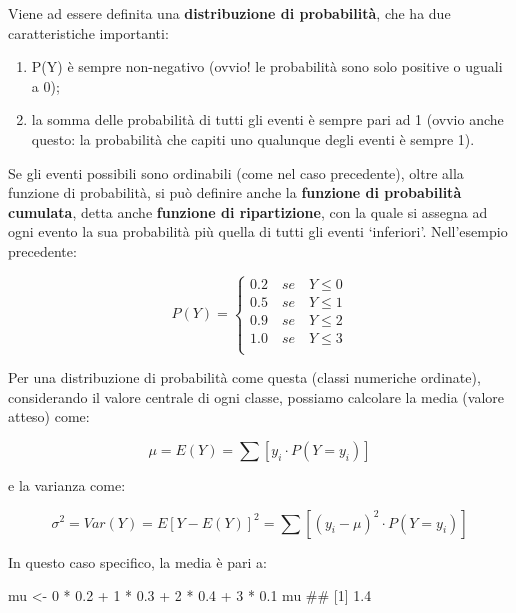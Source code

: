 \documentclass[a4paper,12pt,oneside]{book}
\providecommand{\tightlist}{%
  \setlength{\itemsep}{0pt}\setlength{\parskip}{0pt}}
\newenvironment{Shaded}{\begin{snugshade}}{\end{snugshade}}
\newcommand{\DecValTok}[1]{#1}
\newcommand{\FloatTok}[1]{#1}
\newcommand{\SpecialCharTok}[1]{#1}
\newcommand{\DocumentationTok}[1]{#1}
\newcommand{\OtherTok}[1]{#1}
\newcommand{\NormalTok}[1]{#1}
\begin{document}
Viene ad essere definita una \textbf{distribuzione di probabilità}, che ha due caratteristiche importanti:

\begin{enumerate}
\def\labelenumi{\arabic{enumi}.}
\tightlist
\item
  P(Y) è sempre non-negativo (ovvio! le probabilità sono solo positive o uguali a 0);
\item
  la somma delle probabilità di tutti gli eventi è sempre pari ad 1 (ovvio anche questo: la probabilità che capiti uno qualunque degli eventi è sempre 1).
\end{enumerate}

Se gli eventi possibili sono ordinabili (come nel caso precedente), oltre alla funzione di probabilità, si può definire anche la \textbf{funzione di probabilità cumulata}, detta anche \textbf{funzione di ripartizione}, con la quale si assegna ad ogni evento la sua probabilità più quella di tutti gli eventi `inferiori'. Nell'esempio precedente:

\[
P(Y) = \left\{ \begin{array}{l}
 0.2\,\,\,\,\,\,se\,\,\,\,\,\,Y \leq 0 \\ 
 0.5\,\,\,\,\,\,se\,\,\,\,\,\,Y \leq 1 \\ 
 0.9\,\,\,\,\,\,se\,\,\,\,\,\,Y \leq 2 \\ 
 1.0\,\,\,\,\,\,se\,\,\,\,\,\,Y \leq 3 \\ 
 \end{array} \right.
\]

Per una distribuzione di probabilità come questa (classi numeriche ordinate), considerando il valore centrale di ogni classe, possiamo calcolare la media (valore atteso) come:

\[
\mu  = E(Y) = \sum{\left[ y_i \cdot P(Y = y_i ) \right]}
\]

e la varianza come:

\[\sigma ^2  = Var(Y) = E\left[ {Y - E(Y)} \right]^2  = \sum{ \left[ {\left( {y_i  - \mu } \right)^2 \cdot P(Y = y_i )} \right]}\]

In questo caso specifico, la media è pari a:

\begin{Shaded}
\begin{Highlighting}[]
\NormalTok{mu }\OtherTok{\textless{}{-}} \DecValTok{0} \SpecialCharTok{*} \FloatTok{0.2} \SpecialCharTok{+} \DecValTok{1} \SpecialCharTok{*} \FloatTok{0.3} \SpecialCharTok{+} \DecValTok{2} \SpecialCharTok{*} \FloatTok{0.4} \SpecialCharTok{+} \DecValTok{3} \SpecialCharTok{*} \FloatTok{0.1}
\NormalTok{mu}
\DocumentationTok{\#\# [1] 1.4}
\end{Highlighting}
\end{Shaded}
\end{document}
